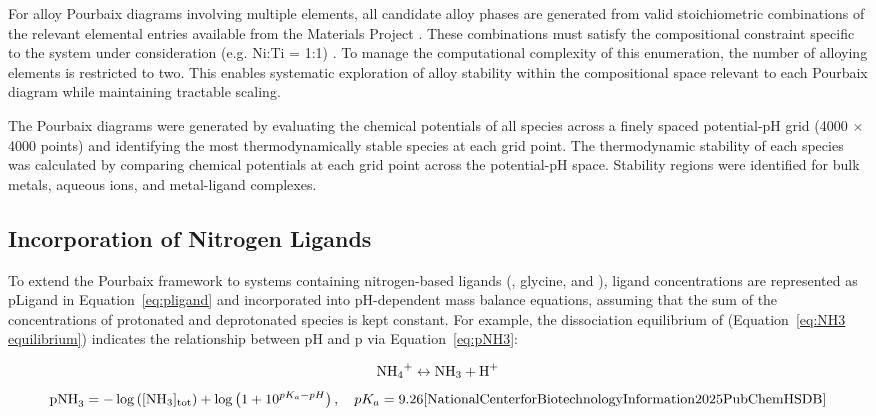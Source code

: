 \documentclass[journal=jacsat,manuscript=article]{achemso}
\begin{document}
For alloy Pourbaix diagrams involving multiple elements, all candidate alloy phases are generated from valid stoichiometric combinations of the relevant elemental entries available from the Materials Project \cite{Jain2013TheInnovation}. These combinations must satisfy the compositional constraint specific to the system under consideration (e.g. Ni:Ti = 1:1) \cite{Thompson2011PourbaixSystems}. To manage the computational complexity of this enumeration, the number of alloying elements is restricted to two. This enables systematic exploration of alloy stability within the compositional space relevant to each Pourbaix diagram while maintaining tractable scaling. 





The Pourbaix diagrams were generated by evaluating the chemical potentials of all species across a finely spaced potential-pH grid (4000 $\times$ 4000 points) and identifying the most thermodynamically stable species at each grid point. The thermodynamic stability of each species was calculated by comparing chemical potentials at each grid point across the potential-pH space. Stability regions were identified for bulk metals, aqueous ions, and metal-ligand complexes. 



\subsection{Incorporation of Nitrogen Ligands}

To extend the Pourbaix framework to systems containing nitrogen-based ligands (, glycine, and ), ligand concentrations are represented as pLigand in Equation~\eqref{eq:pligand} and incorporated into pH-dependent mass balance equations, assuming that the sum of the concentrations of protonated and deprotonated species is kept constant. For example, the dissociation equilibrium of  (Equation~\eqref{eq:NH3 equilibrium}) indicates the relationship between pH and p via Equation~\eqref{eq:pNH3}:

\begin{equation} \label{eq:NH3 equilibrium}
\ce{NH4+} \leftrightarrow \ce{NH3} + \ce{H+}
\end{equation}
\begin{equation} \label{eq:pNH3}
\text{pNH}_3 = -\log \left([\text{NH}_3]_{\text{tot}}\right) + \log \left(1 + 10^{pK_a - pH} \right), \quad pK_a = 9.26 \cite{NationalCenterforBiotechnologyInformation2025PubChemHSDB}
\end{equation}
\end{document}
